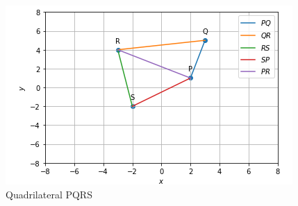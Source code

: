 \documentclass[journal,12pt,twocolumn]{IEEEtran}
\begin{document}
\begin{figure}[!ht]
    \centering
    \includegraphics[width=\columnwidth]{QUAD.PNG}
    \caption{Quadrilateral PQRS}
    \label{fig:Quad PQRS}
\end{figure}
\end{document}
